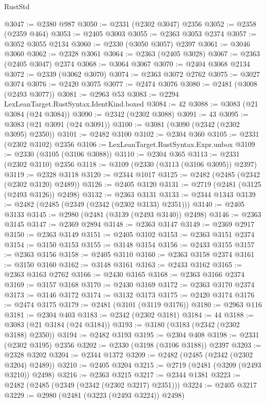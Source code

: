 \begin{lexlean}{RustStd}
\begin{coremodule}
@3047 := @2380 @987
@3050 := @2331 (@2302 @3047) @2356
@3052 := @2358 (@2359 @464)
@3053 := @2405 @3003
@3055 := @2363 @3053 @2374
@3057 := @3052 @3055 @2134
@3060 := @2330 (@3050 @3057) @2397
@3061 := @3046 @3060
@3062 := @2328 @3061
@3064 := @2363 (@2405 @3028)
@3067 := @2363 (@2405 @3047) @2374
@3068 := @3064 @3067
@3070 := @2404 @3068 @2134
@3072 := @2339 (@3062 @3070)
@3074 := @2363 @3072 @2762
@3075 := @3027 @3074
@3076 := @2420 @3075
@3077 := @2474 @3076
@3080 := @2481 (@3008 (@2493 @3077))
@3081 := @2963 @53
@3083 := @2294 LexLeanTarget.RustSyntax.IdentKind.boxed
@3084 := 42
@3088 := @3083 (@21 @3084 (@24 @3084))
@3090 := @2342 (@2302 @3088)
@3091 := 43
@3095 := @3083 (@21 @3091 (@24 @3091))
@3100 := @3081 (@3090 (@2342 (@2302 @3095) @2350))
@3101 := @2482 @3100
@3102 := @2304 @360
@3105 := @2331 (@2302 @3102) @2356
@3106 := LexLeanTarget.RustSyntax.Expr.unbox
@3109 := @2330 (@3105 (@3106 @3088))
@3110 := @2304 @365
@3113 := @2331 (@2302 @3110) @2356
@3118 := @3109 (@2330 (@3113 (@3106 @3095)) @2397)
@3119 := @2328 @3118
@3120 := @2344 @1017
@3125 := @2482 (@2485 (@2342 (@2302 @3120) @2489))
@3126 := @2405 @3120
@3131 := @2719 (@2481 (@3125 (@2493 @3126)) @2498)
@3132 := @2363 @3131
@3133 := @2344 @1343
@3139 := @2482 (@2485 (@2349 (@2342 (@2302 @3133) @2351)))
@3140 := @2405 @3133
@3145 := @2980 (@2481 (@3139 (@2493 @3140)) @2498)
@3146 := @2363 @3145
@3147 := @2369 @2894
@3148 := @2363 @3147
@3149 := @2369 @2917
@3150 := @2363 @3149
@3151 := @2405 @3102
@3153 := @2363 @3151 @2374
@3154 := @3150 @3153
@3155 := @3148 @3154
@3156 := @2433 @3155
@3157 := @2363 @3156
@3158 := @2405 @3110
@3160 := @2363 @3158 @2374
@3161 := @3150 @3160
@3162 := @3148 @3161
@3163 := @2433 @3162
@3165 := @2363 @3163 @2762
@3166 := @2430 @3165
@3168 := @2363 @3166 @2374
@3169 := @3157 @3168
@3170 := @2430 @3169
@3172 := @2363 @3170 @2374
@3173 := @3146 @3172
@3174 := @3132 @3173
@3175 := @2420 @3174
@3176 := @2474 @3175
@3179 := @2481 (@3101 (@3119 @3176))
@3180 := @2963 @116
@3181 := @2304 @403
@3183 := @2342 (@2302 @3181)
@3184 := 44
@3188 := @3083 (@21 @3184 (@24 @3184))
@3193 := @3180 (@3183 (@2342 (@2302 @3188) @2350))
@3194 := @2482 @3193
@3195 := @2304 @408
@3198 := @2331 (@2302 @3195) @2356
@3202 := @2330 (@3198 (@3106 @3188)) @2397
@3203 := @2328 @3202
@3204 := @2344 @1372
@3209 := @2482 (@2485 (@2342 (@2302 @3204) @2489))
@3210 := @2405 @3204
@3215 := @2719 (@2481 (@3209 (@2493 @3210)) @2498)
@3216 := @2363 @3215
@3217 := @2344 @1381
@3223 := @2482 (@2485 (@2349 (@2342 (@2302 @3217) @2351)))
@3224 := @2405 @3217
@3229 := @2980 (@2481 (@3223 (@2493 @3224)) @2498)

\end{coremodule}
\end{lexlean}

